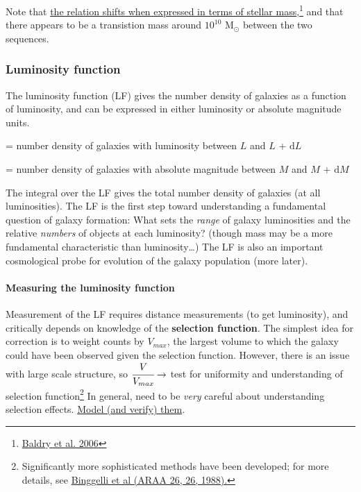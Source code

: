 \documentclass{article}
\begin{document}
Note that \href{http://astronomy.nmsu.edu/holtz/a555/images/mnr_11081_f7.htm}
{the relation shifts when expressed in terms of stellar mass},\footnote{\href{http://adsabs.harvard.edu/abs/2006MNRAS.373..469B}
    {Baldry et al. 2006}
}
and that there appears to be a transistion
mass around $10^{10}$ M$_{\odot}$ between the two sequences.

\subsubsection{Luminosity function}
The luminosity function (LF) gives the number density of galaxies as a
function of luminosity, and can be expressed in either luminosity or
absolute magnitude units.
\begin{description}[labelwidth=3em, labelindent=0.25in]
    \item [$\Phi(L)$] = number density of galaxies with
        luminosity between $L$ and $L$ + $\mathrm{d}L$
    \item [$\Phi(M)$] = number density of galaxies with absolute
        magnitude between $M$ and $M$ + $\mathrm{d}M$
\end{description}
The integral over the LF gives the total number density of galaxies (at all
luminosities). The LF is the first step toward understanding a fundamental
question of galaxy formation: What sets the \emph{range} of galaxy luminosities
and the relative \emph{numbers} of objects at each luminosity? (though mass may
be a more fundamental characteristic than luminosity\ldots) The LF is also an
important cosmological probe for evolution of the galaxy population (more
later).

\paragraph{Measuring the luminosity function}
Measurement of the LF requires distance measurements (to get luminosity), and
critically depends on knowledge of the \textbf{selection function}.
The simplest idea for correction is to weight counts by $V_{max}$, the largest
volume to which the galaxy could have been observed given the selection
function. However, there is an issue with large scale structure, so
$\cfrac{V}{V_{max}} \rightarrow$ test for uniformity and understanding
of selection function\footnote{
    Significantly more sophisticated methods have been developed; for more details, see
    \href{http://adsabs.harvard.edu/cgi-bin/nph-bib_query?bibcode=1988ARA\%26A..26..509}
    {Binggelli et al (ARAA 26, 26, 1988).}
}
In general, need to be \emph{very} careful about understanding selection effects.
\href{http://astronomy.nmsu.edu/holtz/a555/resources/lf_selection.gif}
{Model (and verify) them}.
\end{document}

